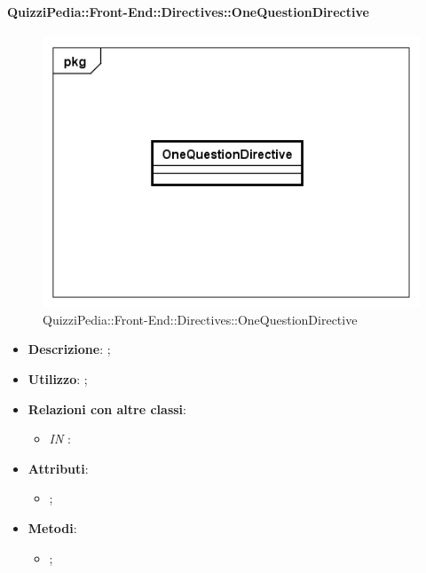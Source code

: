 \paragraph{QuizziPedia::Front-End::Directives::OneQuestionDirective}

\label{QuizziPedia::Front-End::Directives::OneQuestionDirective}

\begin{figure}[h]
	\centering
	\includegraphics[scale=0.5,keepaspectratio]{UML/Classi/Front-End/QuizziPedia_Front-end_Directives_OneQuestionDirective.png}
	\caption{QuizziPedia::Front-End::Directives::OneQuestionDirective}
\end{figure}

\begin{itemize}
	\item \textbf{Descrizione}: ;
	\item \textbf{Utilizzo}: ;
	\item \textbf{Relazioni con altre classi}: 
	\begin{itemize}
		\item \textit{IN} \texttt{}: 
	\end{itemize}
	\item \textbf{Attributi}: 
	\begin{itemize}
		\item ;
	\end{itemize}
	\item \textbf{Metodi}: 
	\begin{itemize}
		\item ;
	\end{itemize}
\end{itemize}


